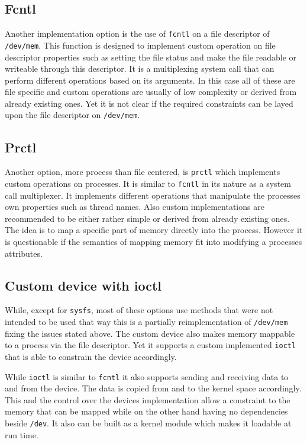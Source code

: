 \documentclass[
a4paper,
12pt,
notitlepage,
parskip=half,
DIV=11,
]{scrbook}
\begin{document}
		\subsection{Fcntl}
		
		Another implementation option is the use of \texttt{fcntl} on a file descriptor of \texttt{/dev/mem}.
		This function is designed to implement custom operation on file descriptor properties such as setting the file status and make the file readable or writeable through this descriptor.
		It is a multiplexing system call that can perform different operations based on its arguments.
		In this case all of these are file specific and custom operations are usually of low complexity or derived from already existing ones.
		Yet it is not clear if the required constraints can be layed upon the file descriptor on \texttt{/dev/mem}. \citep{syscall} \citep{fcntl}
		
		\subsection{Prctl}
		
		Another option, more process than file centered, is \texttt{prctl} which implements custom operations on processes.
		It is similar to \texttt{fcntl} in its nature as a system call multiplexer.
		It implements different operations that manipulate the processes own properties such as thread names.
		Also custom implementations are recommended to be either rather simple or derived from already existing ones.
		The idea is to map a specific part of memory directly into the process.
		However it is questionable if the semantics of mapping memory fit into modifying a processes attributes. \citep{syscall} \citep{prctl}
		
		\subsection{Custom device with ioctl}
		\label{hwio}
		
		While, except for \texttt{sysfs}, most of these options use methods that were not intended to be used that way this is a partially reimplementation of \texttt{/dev/mem} fixing the issues stated above.
		The custom device also makes memory mappable to a process via the file descriptor.
		Yet it supports a custom implemented \texttt{ioctl} that is able to constrain the device accordingly.
		
		While \texttt{ioctl} is similar to \texttt{fcntl} it also supports sending and receiving data to and from the device.
		The data is copied from and to the kernel space accordingly.
		This and the control over the devices implementation allow a constraint to the memory that can be mapped while on the other hand having no dependencies beside \texttt{/dev}.
		It also can be built as a kernel module which makes it loadable at run time. \citep{ioctl}
		
\end{document}
